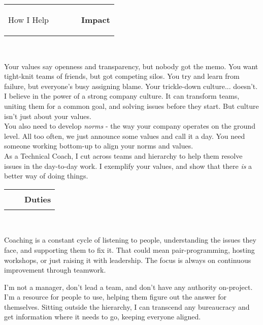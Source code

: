 \documentclass[hidelinks, 12pt, a4paper]{article}
\begin{document}
	\vspace{24pt}
	\begin{tabularx}{\textwidth}{@{}llXrr@{}}
		\begin{Large}How I Help\end{Large}&
		\rule{80pt}{1pt}&&
		\rule{63pt}{1pt}&
		\textbf{Impact}
	\end{tabularx}\\

	\begin{multicols}{2}
		Your values say openness and transparency, but nobody got the memo.
		You want tight-knit teams of friends, but got competing silos.
		You try and learn from failure, but everyone's busy assigning blame.
		Your trickle-down culture... doesn't.\\
		
		I believe in the power of a strong company culture.
		It can transform teams, uniting them for a common goal, and solving issues before they start.		
		But culture isn't just about your values.\\
		
		You also need to develop \emph{norms} - the way your company operates on the ground level.
		All too often, we just announce some values and call it a day.
		You need someone working bottom-up to align your norms and values.\\
		
		As a Technical Coach, I cut across teams and hierarchy to help them resolve issues in the day-to-day work.
		I exemplify your values, and show that there \emph{is} a better way of doing things.
	\end{multicols}

	\begin{tabularx}{\textwidth}{@{}Xrr@{}}&
		\rule{50pt}{1pt}&
		\textbf{Duties}
	\end{tabularx}\\

	\begin{multicols}{2}
		Coaching is a constant cycle of listening to people, understanding the issues they face, and supporting them to fix it.
		That could mean pair-programming, hosting workshops, or just raising it with leadership.
		The focus is always on continuous improvement through teamwork.
		
		I'm not a manager, don't lead a team, and don't have any authority on-project.
		I'm a resource for people to use, helping them figure out the answer for themselves.
		Sitting outside the hierarchy, I can transcend any bureaucracy and get information where it needs to go, keeping everyone aligned.
	\end{multicols}
\end{document}
